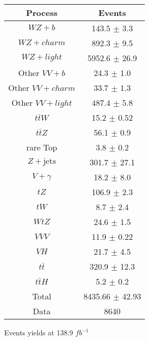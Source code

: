 \begin{center}
\begin{tabular}{|c|c|}
\hline
Process & Events \\
\hline 
  $WZ + b$   & 143.5 $\pm$ 3.3 \\ 
  $WZ + charm$   & 892.3 $\pm$ 9.5 \\ 
  $WZ + light$   & 5952.6 $\pm$ 26.9 \\ 
  Other $VV + b$   & 24.3 $\pm$ 1.0 \\ 
  Other $VV + charm$   & 33.7 $\pm$ 1.3 \\ 
  Other $VV + light$   & 487.4 $\pm$ 5.8 \\ 
  $t\bar{t}W$   & 15.2 $\pm$ 0.52 \\ 
  $t\bar{t}Z$   & 56.1 $\pm$ 0.9 \\ 
  rare Top   & 3.8 $\pm$ 0.2 \\ 
  $Z+\text{jets}$   & 301.7 $\pm$ 27.1 \\ 
  $V+\gamma$   & 18.2 $\pm$ 8.0 \\ 
  $tZ$   & 106.9 $\pm$ 2.3 \\ 
  $tW$   & 8.7 $\pm$ 2.4 \\ 
  $WtZ$   & 24.6 $\pm$ 1.5 \\ 
  $VVV$   & 11.9 $\pm$ 0.22 \\ 
  $VH$   & 21.7 $\pm$ 4.5 \\ 
  $t\bar{t}$   & 320.9 $\pm$ 12.3 \\ 
  $t\bar{t}H$   & 5.2 $\pm$ 0.2 \\ 
\hline 
  Total  & 8435.66 $\pm$ 42.93 \\ 
\hline
  Data   & 8640 \\
\hline 
\end{tabular} 
\caption{Events yields at 138.9 $fb^{-1}$} 
\end{center} 
